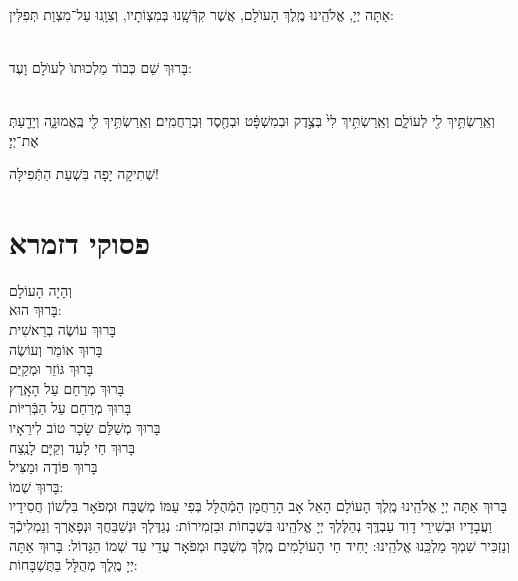 \documentclass[twoside, openany, parskip=half, 11pt]{book}
\begin{document}
\\
 אַתָּה יְיָ, אֱלֹהֵֽינוּ מֶֽלֶךְ הָעוֺלָם, אֲשֶׁר קִדְּֿשָֽׁנוּ בְּמִצְוֹתָיו, וְצִוָֽנוּ עַל־מִצְוַת תְּפִלִּין:

\\
בָּרוּךְ שֵׁם כְּבוֺד מַלְכוּתוֺ לְעוֺלָם וָעֶד:


\\
וְאֵֽרַשְׂתִּ֥יךְ
 לִ֖י לְעוֹלָ֑ם וְאֵֽרַשְׂתִּ֥יךְ לִי֙ בְּצֶ֣דֶק וּבְמִשְׁפָּ֔ט וּבְחֶ֖סֶד וּֽבְרַחֲמִֽים׃ וְאֵֽרַשְׂתִּ֥יךְ לִ֖י בֶּֽאֱמוּנָ֑ה וְיָדַ֖עַתְּ אֶת־יְיָ׃


\vfill

\begin{Large}
שְׁתִיקָה יָפָה בִּשְׁעַת הַתְּֿפִילָּה!
\end{Large}

\section[פסוקי דזמרא]{ פסוקי דזמרא }

וְהָיָה הָעוֹלָם \\
בָּרוּךְ הוּא:\\
 בָּרוּךְ עוֹשֶׂה בְרֵאשִׁית \\
 בָּרוּךְ אוֹמֵר וְעוֹשֶׂה \\
 בָּרוּךְ גּוֹזֵר וּמְקַיֵּם \\
 בָּרוּךְ מְרַחֵם עַל הָאָֽרֶץ \\
 בָּרוּךְ מְרַחֵם עַל הַבְּֿרִיּוֹת \\
 בָּרוּךְ מְשַׁלֵּם שָׂכָר טוֹב לִירֵאָיו \\
 בָּרוּךְ חַי לָעַד וְקַיָּם לָנֶֽצַח \\
 בָּרוּךְ פּוֹדֶה וּמַצִּיל \\
 בָּרוּךְ שְׁמוֹ: \\
 בָּרוּךְ אַתָּה יְיָ אֱלֹהֵֽינוּ מֶֽלֶךְ הָעוֹלָם הָאֵל אָב הָרַחֲמָן הַמְֿהֻלָּל בְּפִי עַמּוֹ מְשֻׁבָּח וּמְפֹאָר בִּלְשׁוֹן חֲסִידָיו וַעֲבָדָיו וּבְשִׁירֵי דָוִד עַבְדֶּֽךָ נְהַלֶּלְךָ יְיָ אֱלֹהֵֽינוּ בִּשְׁבָחוֹת וּבִזְמִירוֹת: נְגַדֶּלְךָ וּנְשַׁבֵּחֲךָ וּנְפָאֶרְךָ וְנַמְלִיכְֿךָ וְנַזְכִּיר שִׁמְךָ מַלְכֵּֽנוּ אֱלֹהֵֽינוּ:
יָחִיד חַי הָעוֹלָמִים מֶֽלֶךְ מְשֻׁבָּח וּמְפֹאָר עֲדֵי עַד שְׁמוֹ הַגָּדוֹל: בָּרוּךְ אַתָּה יְיָ מֶֽלֶךְ מְהֻלָּל בַּתֻּשְׁבָּחוֹת:
\end{document}
